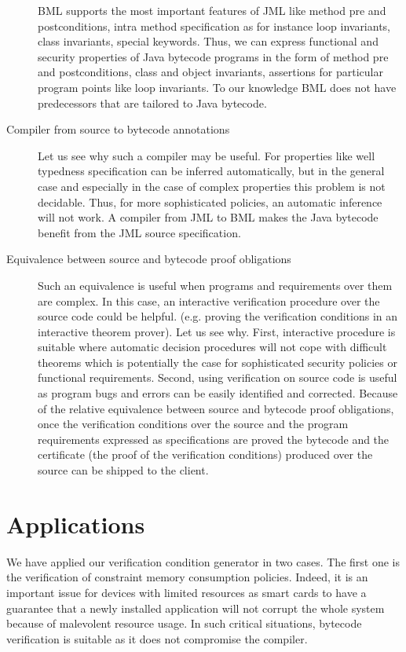 \begin{description}
	 BML supports the most important features of JML like method pre and postconditions, intra method specification as for instance loop invariants, class invariants, special
	 keywords. Thus, we can express functional and security properties of Java
	 bytecode programs in the form of method pre and postconditions, class and object invariants, assertions
	 for particular program points like loop invariants. To our knowledge BML does not have predecessors that are tailored 
	 to Java bytecode.  

   \item [Compiler from source to bytecode annotations]
         Let us see why such a compiler may be useful.
	 For properties like well typedness specification can be inferred automatically,
	 but in the general case and especially in the case of complex properties this problem is not decidable.  
	 Thus, for more sophisticated policies, an automatic inference will not work.
	 A compiler from JML to BML  makes the Java  bytecode benefit from the JML source specification.

    \item[Equivalence between source and bytecode proof obligations] Such an equivalence is useful when programs and requirements over them are complex.
         In this case, an interactive verification procedure over the source code  could be helpful.
	 (e.g. proving the verification conditions in an interactive theorem prover).
	 Let us see why.
	 First, interactive  procedure is suitable where automatic decision procedures will not cope with
	 difficult theorems which is potentially the case for sophisticated security policies or functional requirements. 
	 Second, using verification on source code is useful as program bugs and errors can be easily identified and corrected.
	 Because of the relative equivalence between source and bytecode proof obligations, 
	 once the verification conditions over the source and the program requirements expressed as specifications are
	 proved the bytecode and the certificate (the proof of the verification conditions) produced over the source
	 can be shipped  to the client.
\end{description}

\section{Applications}
We have applied our verification condition generator in two cases. The first one is the verification of constraint memory consumption policies.
 Indeed, it is an important issue for devices with limited resources as smart cards to have a guarantee that a newly installed application 
will not corrupt the whole system because of malevolent resource usage. In such critical situations, bytecode verification is suitable
as it does not compromise the compiler. 


